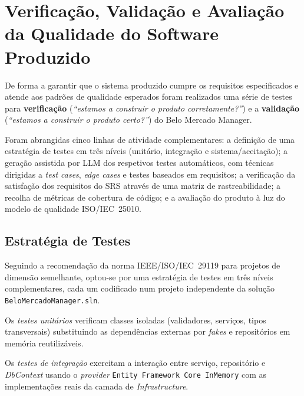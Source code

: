 \chapter{Verificação, Validação e Avaliação da Qualidade do Software Produzido}

    De forma a garantir que o sistema produzido cumpre os requisitos especificados e atende aos padrões de qualidade esperados foram realizados uma série de testes para \textbf{verificação} (\textit{``estamos a construir o produto corretamente?''}) e a \textbf{validação} (\textit{``estamos a construir o produto certo?''}) do Belo Mercado Manager.

    Foram abrangidas cinco linhas de atividade complementares: a definição de uma estratégia de testes em três níveis (unitário, integração e sistema/aceitação); a geração assistida por LLM dos respetivos testes automáticos, com técnicas dirigidas a \textit{test cases}, \textit{edge cases} e testes baseados em requisitos; a verificação da satisfação dos requisitos do SRS através de uma matriz de rastreabilidade; a recolha de métricas de cobertura de código; e a avaliação do produto à luz do modelo de qualidade ISO/IEC~25010.

\section{Estratégia de Testes}

    Seguindo a recomendação da norma IEEE/ISO/IEC~29119 para projetos de dimensão semelhante, optou-se por uma estratégia de testes em três níveis complementares, cada um codificado num projeto independente da solução \texttt{BeloMercadoManager.sln}.

    Os \textit{testes unitários} verificam classes isoladas (validadores, serviços, tipos transversais) substituindo as dependências externas por \textit{fakes} e repositórios em memória reutilizáveis.

    Os \textit{testes de integração} exercitam a interação entre serviço, repositório e \textit{DbContext} usando o \textit{provider} \texttt{Entity~Framework~Core~InMemory} com as implementações reais da camada de \textit{Infrastructure}.


